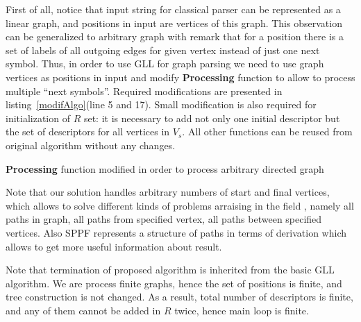 First of all, notice that input string for classical parser can be represented as a linear graph, and positions in input are vertices of this graph.
This observation can be generalized to arbitrary graph with remark that for a position there is a set of labels of all outgoing edges for given vertex instead of just one next symbol. 
Thus, in order to use GLL for graph parsing we need to use graph vertices as positions in input and modify \textbf{Processing} function to allow to process multiple ``next symbols''.
Required modifications are presented in listing~\ref{modifAlgo}(line 5 and 17).
Small modification is also required for initialization of $R$ set: it is necessary to add not only one initial descriptor but the set of descriptors for all vertices in $V_s$.
All other functions can be reused from original algorithm without any changes.

\begin{algorithm}[h]
\begin{algorithmic}[1]
\caption{\textbf{Processing} function modified in order to process arbitrary directed graph}
\label{modifAlgo}
       \Else 
       \EndIf
       \EndIf
       \EndFor
  \EndCase
       \EndFor
  \EndCase
  \EndCase
  \Case{$\_$}
  \EndCase
  \EndSwitch
\EndFunction

\end{algorithmic}
\end{algorithm}

Note that our solution handles arbitrary numbers of start and final vertices, which allows to solve different kinds of problems arraising in the field
, namely all paths in graph, all paths from specified vertex, all paths between specified vertices. 
Also SPPF represents a structure of paths in terms of derivation which allows to get more useful information about result. 

Note that termination of proposed algorithm is inherited from the basic GLL algorithm.
We are process finite graphs, hence the set of positions is finite, and tree construction is not changed. 
As a result, total number of descriptors is finite, and any of them cannot be added in $R$ twice, hence main loop is finite.
